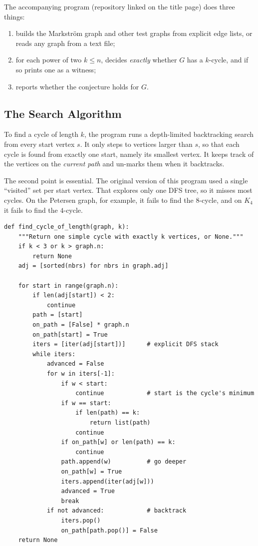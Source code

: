 \documentclass[11pt,a4paper]{article}
\theoremstyle{definition}
\begin{document}
The accompanying program (repository linked on the title page) does three
things:
\begin{enumerate}
  \item builds the Markstr\"om graph and other test graphs from explicit edge
        lists, or reads any graph from a text file;
  \item for each power of two $k\le n$, decides \emph{exactly} whether $G$
        has a $k$-cycle, and if so prints one as a witness;
  \item reports whether the conjecture holds for $G$.
\end{enumerate}

\subsection{The Search Algorithm}

To find a cycle of length $k$, the program runs a depth-limited backtracking
search from every start vertex $s$. It only steps to vertices larger than $s$,
so that each cycle is found from exactly one start, namely its smallest
vertex. It keeps track of the vertices on the \emph{current path} and
un-marks them when it backtracks.

The second point is essential. The original version of this program used a
single ``visited'' set per start vertex. That explores only one DFS tree, so
it misses most cycles. On the Petersen graph, for example, it fails to find
the $8$-cycle, and on $K_4$ it fails to find the $4$-cycle.

\begin{lstlisting}[caption={Exact cycle search (\texttt{src/erdos\_gyarfas/cycles.py}, excerpt).}]
def find_cycle_of_length(graph, k):
    """Return one simple cycle with exactly k vertices, or None."""
    if k < 3 or k > graph.n:
        return None
    adj = [sorted(nbrs) for nbrs in graph.adj]

    for start in range(graph.n):
        if len(adj[start]) < 2:
            continue
        path = [start]
        on_path = [False] * graph.n
        on_path[start] = True
        iters = [iter(adj[start])]      # explicit DFS stack
        while iters:
            advanced = False
            for w in iters[-1]:
                if w < start:
                    continue            # start is the cycle's minimum
                if w == start:
                    if len(path) == k:
                        return list(path)
                    continue
                if on_path[w] or len(path) == k:
                    continue
                path.append(w)          # go deeper
                on_path[w] = True
                iters.append(iter(adj[w]))
                advanced = True
                break
            if not advanced:            # backtrack
                iters.pop()
                on_path[path.pop()] = False
    return None
\end{lstlisting}
\end{document}

